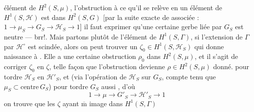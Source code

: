 élément de $H^2(S,\mu)$, l'obstruction à ce qu'il
se relève en un élément \inserted{$\zeta$} de $H^1(S,\mathcal H)$ est
dans $H^2(S,G)$ [par la suite exacte
de  associée : $1\longrightarrow\mu_S\longrightarrow G_S\longrightarrow\mathcal H_S\longrightarrow1$]
il faut exprimer qu'une certaine  gerbe
liée par $G_S$ est neutre --- brr!. Mais
partons plutôt de l'élément \inserted{\unsure{$\omega$|$\widetilde\zeta$}} de $H^1(S,\Gamma)$,
si l'extension de $\Gamma$ par $\mathcal H^\circ$ est scindée, alors
on peut trouver un $\zeta_0\in H^1(S,\mathcal H_S)$ qui
donne naissance à \unsure{$\omega$}. Elle a une certaine
obstruction $\rho_0$ dans $H^2(S,\mu)$, et il s'agit
de corriger $\zeta_0$ en $\zeta$,  telle façon que
l'obstruction devienne $\rho\in H^2(S,\mu)$ donné.
  pour tordre $\mathcal H_S$ en
$\mathcal H'_S$, et (via l'opération de $\mathcal H_S$  sur $G_S$,
compte tenu que $\mu_S\subset\mathrm{centre}\,G_S$) pour
tordre $G_S$ aussi , d'où
\[
1\longrightarrow\mu\longrightarrow G'_S\longrightarrow\mathcal H'_S\longrightarrow1
\]
on trouve que les $\zeta$ ayant $\overline{\mathrm m}$ image dans $H^1(S,\Gamma)$
